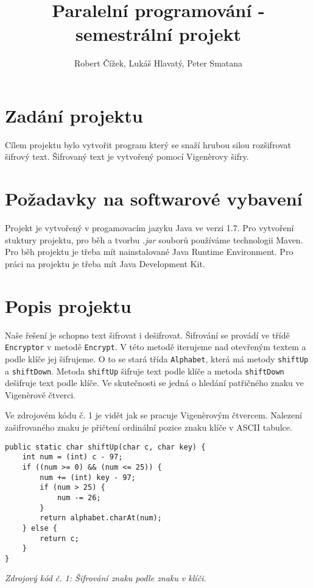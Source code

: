 \documentclass{article}
\title{Paralelní programování - semestrální projekt}
\author{Robert Čížek, Lukáš Hlavatý, Peter Smatana}
\begin{document}
\maketitle

\section{Zadání projektu}
Cílem projektu bylo vytvořit program který se snaží hrubou silou rozšifrovat šifrový text.
Šifrovaný text je vytvořený pomocí Vigenèrovy šifry.
\newline

\section{Požadavky na softwarové vybavení}
Projekt je vytvořený v progamovacím jazyku Java ve verzi 1.7. Pro vytvoření stuktury projektu,
pro běh a tvorbu \textit{.jar} souborů používáme technologii Maven. Pro běh projektu je třeba
mít nainstalované Java Runtime Environment. Pro práci na projektu je třeba mít Java Development
Kit.
\newline

\section{Popis projektu}
Naše řešení je schopno text šifrovat i dešifrovat. Šifrování se provádí ve třídě
\texttt{Encryptor} v metodě \texttt{Encrypt}. V této metodě iterujeme nad otevřeným textem
a podle klíče jej šifrujeme. O to se stará třída \texttt{Alphabet}, která má metody
\texttt{shiftUp} a \texttt{shiftDown}. Metoda \texttt{shiftUp} šifruje text podle klíče
a metoda \texttt{shiftDown} dešifruje text podle klíče. Ve skutečnosti se jedná o hledání
patřičného znaku ve Vigenèrově čtverci.

Ve zdrojovém kódu č. 1 je vidět jak se pracuje Vigenèrovým čtvercem. Nalezení zašifrovaného znaku
je přičtení ordinální pozice znaku klíče v ASCII tabulce.

\begin{center}
\begin{lstlisting}
public static char shiftUp(char c, char key) {
	int num = (int) c - 97;
	if ((num >= 0) && (num <= 25)) {
		num += (int) key - 97;
		if (num > 25) {
			num -= 26;
		}
		return alphabet.charAt(num);
	} else {
		return c;
	}
}
\end{lstlisting}
\vspace{1mm}
\textit{Zdrojový kód č. 1: Šifrování znaku podle znaku v klíči.}
\end{center}
\end{document}
